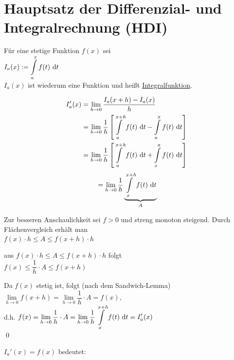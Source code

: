 \clearpage
\section{Hauptsatz der Differenzial- und Integralrechnung (HDI)}
\Def Für eine stetige Funktion $f(x)$ sei\\
$I_a(x):=\displaystyle\int\limits_{a}^{x}f(t)\ \mathrm{d}t$\\
$I_a(x)$ ist wiederum eine Funktion und heißt \ul{Integralfunktion}.

\Beweis
\begin{align*}
I_a'(x) &= \lim\limits_{h\to0}\dfrac{I_a(x+h)-I_a(x)}{h}\\
&= \lim\limits_{h\to0}\dfrac{1}{h}\left[\int\limits_{a}^{x+h}f(t)\ \mathrm{d}t-\int\limits_{a}^{x}f(t)\ \mathrm{d}t\right]\\
&= \lim\limits_{h\to0}\dfrac{1}{h}\left[\int\limits_{a}^{x+h}f(t)\ \mathrm{d}t+\int\limits_{x}^{a}f(t)\ \mathrm{d}t\right]\\
\end{align*}
\begin{align*}
&= \lim\limits_{h\to0}\dfrac{1}{h}\underbrace{\int\limits_{x}^{x+h}f(t)\ \mathrm{d}t}_A\\
\end{align*}

Zur besseren Anschaulichkeit sei $f>0$ und streng monoton steigend.
Durch Flächenvergleich erhält man\\
$f(x)\cdot h\le A\le f(x+h)\cdot h$

aus $f(x)\cdot h \le A\le f(x+h)\cdot h$ folgt\\
$f(x)\le\dfrac{1}{h}\cdot A\le f(x+h)$

Da $f(x)$ stetig ist, folgt (nach dem Sandwich-Lemma)\\
$\lim\limits_{h\to0}f(x+h)=\lim\limits_{h\to0}\dfrac{1}{h}\cdot A=f(x)$,\\
d.h. $f(x)=\lim\limits_{h\to0}\dfrac{1}{h}\cdot A=\lim\limits_{h\to0}\dfrac{1}{h}\displaystyle\int\limits_{x}^{x+h}f(t)\ \mathrm{d}t=I_a'(x)$\\
\qed %

\Bem $I_a'(x)=f(x)$ bedeutet:\\

